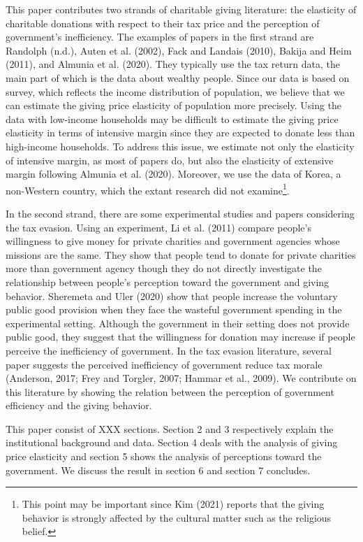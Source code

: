 \documentclass[ review  , 3p ]{elsarticle}
\begin{document}
  This paper contributes two strands of charitable giving literature: the elasticity of charitable donations with respect to their tax price and the perception of government's inefficiency. The examples of papers in the first strand are Randolph (n.d.), Auten et al. (2002), Fack and Landais (2010), Bakija and Heim (2011), and Almunia et al. (2020). They typically use the tax return data, the main part of which is the data about wealthy people. Since our data is based on survey, which reflects the income distribution of population, we believe that we can estimate the giving price elasticity of population more precisely. Using the data with low-income households may be difficult to estimate the giving price elasticity in terms of intensive margin since they are expected to donate less than high-income households. To address this issue, we estimate not only the elasticity of intensive margin, as most of papers do, but also the elasticity of extensive margin following Almunia et al. (2020).
  Moreover, we use the data of Korea, a non-Western country, which the extant research did not examine\footnote{This point may be important since Kim (2021) reports that the giving behavior is strongly affected by the cultural matter such as the religious belief.}.
  
  In the second strand, there are some experimental studies and papers considering the tax evasion. Using an experiment, Li et al. (2011) compare people's willingness to give money for private charities and government agencies whose missions are the same. They show that people tend to donate for private charities more than government agency though they do not directly investigate the relationship between people's perception toward the government and giving behavior. Sheremeta and Uler (2020) show that people increase the voluntary public good provision when they face the wasteful government spending in the experimental setting. Although the government in their setting does not provide public good, they suggest that the willingness for donation may increase if people perceive the inefficiency of government. In the tax evasion literature, several paper suggests the perceived inefficiency of government reduce tax morale (Anderson, 2017; Frey and Torgler, 2007; Hammar et al., 2009). We contribute on this literature by showing the relation between the perception of government efficiency and the giving behavior.
  
  This paper consist of XXX sections. Section 2 and 3 respectively explain the institutional background and data. Section 4 deals with the analysis of giving price elasticity and section 5 shows the analysis of perceptions toward the government. We discuss the result in section 6 and section 7 concludes.
  
\end{document}
